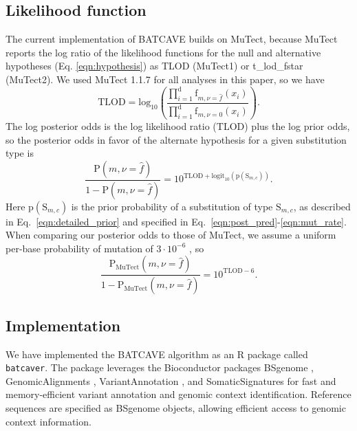 \documentclass[a4,center,fleqn]{NAR}
\newcommand{\batcave}{BATCAVE\xspace}
\begin{document}
\subsection{Likelihood function}
The current implementation of \batcave builds on MuTect, because MuTect reports the log ratio of the likelihood functions for the null and alternative hypotheses (Eq. \ref{eqn:hypothesis}) as \textrm{TLOD} (MuTect1) or \textrm{t\_lod\_fstar} (MuTect2).
We used MuTect 1.1.7 for all analyses in this paper, so we have
\begin{equation}
  \label{eqn:tlod}
    \mathrm{TLOD} = \mathrm{log}_{10}\left(\frac{\prod_{i=1}^{\mathrm{d}} \textrm{f}_{m,\nu = \hat{f}}(x_i)}{\prod_{i=1}^{\mathrm{d}} \textrm{f}_{m,\nu = 0}(x_i)}\right).
\end{equation}
The log posterior odds is the log likelihood ratio (\textrm{TLOD}) plus the log prior odds, so the posterior odds in favor of the alternate hypothesis for a given substitution type is
\begin{equation}
  \label{eqn:computed_posterior}
  \frac{\mathrm{P}(m,\nu = \hat{f})}{1 - \mathrm{P}(m,\nu = \hat{f})} = 10^{\mathrm{TLOD} + \mathrm{logit}_{10}(\mathrm{p}(\mathrm{S}_{m,c}))}.
\end{equation}
Here $\mathrm{p}(\mathrm{S}_{m,c})$ is the prior probability of a substitution of type $\mathrm{S}_{m,c}$, as described in Eq.~\ref{eqn:detailed_prior} and specified in Eq.~\ref{eqn:post_pred}-\ref{eqn:mut_rate}.
When comparing our posterior odds to those of MuTect, we assume a uniform per-base probability of mutation of $3\cdot10^{-6}$ \cite{Cibulskis2013}, so
\begin{equation}  \label{eqn:mutect_posterior}
  \frac{\mathrm{P}_\mathrm{MuTect}(m,\nu = \hat{f})}{1 - \mathrm{P}_\mathrm{MuTect}(m,\nu = \hat{f})} = 10^{\mathrm{TLOD} - 6}.
\end{equation}

\subsection{Implementation}
We have implemented the \batcave algorithm as an R package called \texttt{batcaver}.
The package leverages the Bioconductor packages \textrm{BSgenome} \cite{Pages2019}, \textrm{GenomicAlignments} \cite{Lawrence2013}, \textrm{VariantAnnotation} \cite{Obenchain2014}, and \textrm{SomaticSignatures} \cite{Gehring2015} for fast and memory-efficient variant annotation and genomic context identification.
Reference sequences are specified as BSgenome objects, allowing efficient access to genomic context information.
\end{document}
